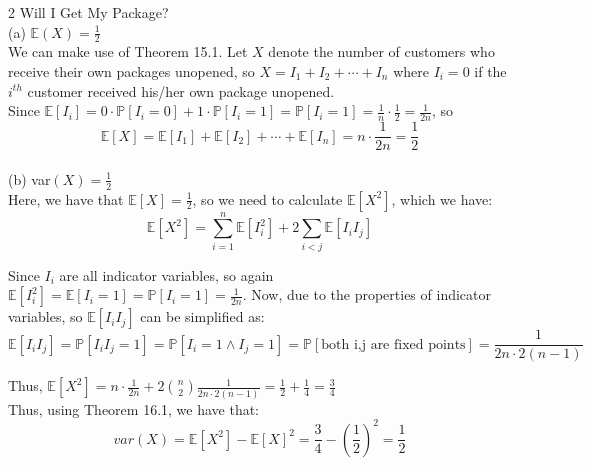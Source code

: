 \documentclass{article}
\begin{document}
{\Large 2 Will I Get My Package?} \\[.5cm]
{\color{red} (a) $\mathbb{E}(X) = \frac{1}{2}$ } \\

We can make use of Theorem 15.1. Let $X$ denote the number of customers who receive their own packages unopened, so $X = I_1 + I_2 + \cdots + I_n$ where $I_i = 0$ if the $i^{th}$ customer received his/her own package unopened. \\

Since $\mathbb{E}[I_i] = 
0\cdot\mathbb{P}[I_i = 0] + 1\cdot\mathbb{P}[I_i = 1] =
\mathbb{P}[I_i = 1] =  \frac{1}{n}\cdot\frac{1}{2} = \frac{1}{2n}$, so $$\mathbb{E}[X] = 
\mathbb{E}[I_1] + \mathbb{E}[I_2] + \cdots + \mathbb{E}[I_n] =
n\cdot\frac{1}{2n} = \frac{1}{2}$$ \\[.5cm]
{\color{red} (b) var$(X) = \frac{1}{2}$ } \\

Here, we have that $\mathbb{E}[X] = \frac{1}{2}$, so we need to calculate $\mathbb{E}[X^2]$, which we have:
$$\mathbb{E}[X^2] = \sum\limits_{i=1}^n \mathbb{E}[I_i^2] + 2\sum\limits_{i<j} \mathbb{E}[I_iI_j]$$

Since $I_i$ are all indicator variables, so again $\mathbb{E}[I_i^2] = \mathbb{E}[I_i=1] = \mathbb{P}[I_i=1] = \frac{1}{2n}$. Now, due to the properties of indicator variables, so $\mathbb{E}[I_iI_j]$ can be simplified as:
$$\mathbb{E}[I_iI_j] = \mathbb{P}[I_iI_j=1] =
\mathbb{P}[I_i=1\land I_j=1] = \mathbb{P}[\text{both i,j are fixed points}] = \frac{1}{2n\cdot2(n-1)}$$

Thus, $\mathbb{E}[X^2] = n\cdot\frac{1}{2n} + 2\binom{n}{2}\frac{1}{2n\cdot2(n-1)} = \frac{1}{2} + \frac{1}{4} = \frac{3}{4}$ \\

Thus, using Theorem 16.1, we have that:
$$var(X) = \mathbb{E}[X^2] - \mathbb{E}[X]^2 = \frac{3}{4} - (\frac{1}{2})^2 = \frac{1}{2}$$
\end{document}
